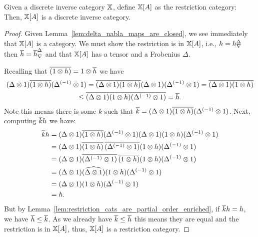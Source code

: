 \begin{proposition}\label{prop:slice-a-is-a-discrete-inverse-category}
  Given a discrete inverse category $\mathbb{X}$, define $\mathbb{X}[A]$ as  the restriction category:
  Then, $\mathbb{X}[A]$ is a discrete inverse category.
\end{proposition}
\begin{proof}
  Given Lemma~\ref{lem:delta_nabla_maps_are_closed}, we see immediately that $\mathbb{X}[A]$ is a
  category. We must show the restriction is in $\mathbb{X}[A]$, i.e.,
  $h={h}^{\Delta}_{\nabla}$ then $\overline{h} = {\overline{h}}^{\Delta}_{\nabla}$ and that $\mathbb{X}[A]$ has a tensor and a Frobenius $\Delta$.

  Recalling that $\overline{(1\otimes h)} = 1\otimes \overline{h}$ we have
  \begin{multline*}
    (\Delta\otimes1) \overline{(1\otimes h)} ({\Delta}^{(-1)}\otimes1) = \overline{(\Delta\otimes1)(1\otimes h)}(\Delta\otimes1)
    ({\Delta}^{(-1)}\otimes1) = \overline{(\Delta\otimes1)(1\otimes h)} \\
      \le \overline{(\Delta\otimes1)(1\otimes h)({\Delta}^{(-1)}\otimes1)} = \overline{h}.
  \end{multline*}
  Note this means there is some $k$ such that
  $\overline{k} = (\Delta\otimes1) \overline{(1\otimes h)}({\Delta}^{(-1)}\otimes1)$. Next, computing $\overline{k}h$ we have:
  \begin{align*}
    \overline{k}h &= (\Delta\otimes1) \overline{(1\otimes h)} ({\Delta}^{(-1)}\otimes1) (\Delta\otimes1) (1\otimes h) ({\Delta}^{(-1)}\otimes1) \\
    & = (\Delta\otimes1) \overline{(1\otimes h)}\, \overline{({\Delta}^{(-1)}\otimes1)} (1\otimes h) ({\Delta}^{(-1)}\otimes1) \\
    & = (\Delta\otimes1) \overline{({\Delta}^{(-1)}\otimes1)}\,  \overline{(1\otimes h)}(1\otimes h) ({\Delta}^{(-1)}\otimes1) \\
    & = (\Delta\otimes1) \widehat{(\Delta\otimes1)}  (1\otimes h) ({\Delta}^{(-1)}\otimes1) \\
    & = (\Delta\otimes1) (1\otimes h) ({\Delta}^{(-1)}\otimes1) \\
    & = h.
  \end{align*}
  But by Lemma~\ref{lem:restriction_cats_are_partial_order_enriched}, if $\overline{k} h = h$, we have
  $\overline{h} \le \overline{k}$. As we already have $\overline{k}\le\overline{h}$ this means they are equal and the
  restriction is in $\mathbb{X}[A]$, thus, $\mathbb{X}[A]$ is a restriction category.


\end{proof}
